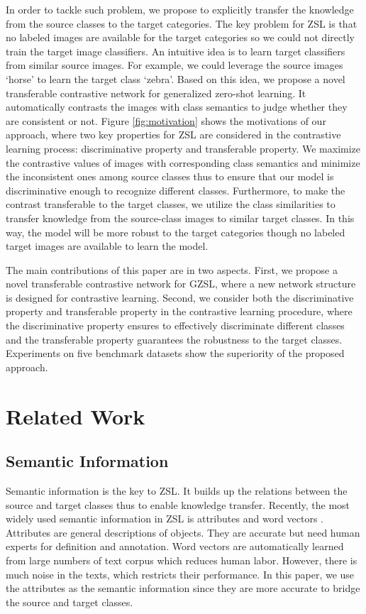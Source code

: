\documentclass[10pt,twocolumn,letterpaper]{article}
\begin{document}
In order to tackle such problem, we propose to explicitly transfer the knowledge from the source classes to the target categories. The key problem for ZSL is that no labeled images are available for the target categories so we could not directly train the target image classifiers. An intuitive idea is to learn target classifiers from similar source images. For example, we could leverage the source images `horse' to learn the target class `zebra'. Based on this idea, we propose a novel transferable contrastive network for generalized zero-shot learning. It automatically contrasts the images with class semantics to judge whether they are consistent or not. Figure \ref{fig:motivation} shows the motivations of our approach, where two key properties for ZSL are considered in the contrastive learning process: discriminative property and transferable property. We maximize the contrastive values of images with corresponding class semantics and minimize the inconsistent ones among source classes thus to ensure that our model is discriminative enough to recognize different classes. Furthermore, to make the contrast transferable to the target classes, we utilize the class similarities to transfer knowledge from the source-class images to similar target classes. In this way, the model will be more robust to the target categories though no labeled target images are available to learn the model.

The main contributions of this paper are in two aspects. First, we propose a novel transferable contrastive network for GZSL, where a new network structure is designed for contrastive learning. Second, we consider both the discriminative property and transferable property in the contrastive learning procedure, where the discriminative property ensures to effectively discriminate different classes and the transferable property guarantees the robustness to the target classes. Experiments on five benchmark datasets show the superiority of the proposed approach.



\section{Related Work}

\subsection{Semantic Information}

Semantic information is the key to ZSL. It builds up the relations between the source and target classes thus to enable knowledge transfer. Recently, the most widely used semantic information in ZSL is attributes \cite{lampert2009learning,farhadi2009describing} and word vectors \cite{mikolov2013distributed}. Attributes are general descriptions of objects. They are accurate but need human experts for definition and annotation. Word vectors are automatically learned from large numbers of text corpus which reduces human labor. However, there is much noise in the texts, which restricts their performance. In this paper, we use the attributes as the semantic information since they are more accurate to bridge the source and target classes.
\end{document}
